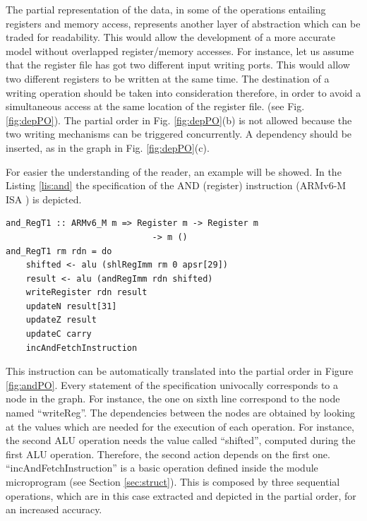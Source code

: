 \documentclass[conference]{IEEEtran}
\begin{document}
The partial representation of the data, in some of the operations entailing registers and
memory access, represents another layer of abstraction which can be traded for readability.
This would allow the development of a more accurate model without overlapped register/memory
accesses. For instance, let us assume that the register file has got two different input
writing ports. This would allow two different registers to be written at the same time.
The destination of a writing operation should be taken into consideration therefore,
in order to avoid a simultaneous access at the same location of the register file.
(see Fig. \ref{fig:depPO}). The partial order in Fig. \ref{fig:depPO}(b) is not allowed
because the two writing mechanisms can be triggered concurrently.
A dependency should be inserted, as in the graph in Fig. \ref{fig:depPO}(c).

For easier the understanding of the reader, an example will be showed. In the Listing
\ref{lis:and} the specification of the AND (register) instruction (ARMv6-M ISA
\cite{armManual}) is depicted.\\

\begin{lstlisting}[caption="AND (register) instruction - Haskell-based specification",
frame=single, label=lis:and]
and_RegT1 :: ARMv6_M m => Register m -> Register m 
			 				 -> m ()
and_RegT1 rm rdn = do
    shifted <- alu (shlRegImm rm 0 apsr[29])
    result <- alu (andRegImm rdn shifted)
    writeRegister rdn result
    updateN result[31]
    updateZ result
    updateC carry
    incAndFetchInstruction
\end{lstlisting}

\noindent
This instruction can be automatically translated into the partial order in Figure
\ref{fig:andPO}. Every statement of the specification univocally corresponds to a node in the
graph. For instance, the one on sixth line correspond to the node named ``writeReg''.
The dependencies between the nodes are obtained by looking at the values which are needed for
the execution of each operation. For instance, the second ALU operation needs the value
called ``shifted'', computed during the first ALU operation. Therefore, the second action
depends on the first one.
``incAndFetchInstruction'' is a basic operation defined inside the module microprogram (see
Section \ref{sec:struct}). This is composed by three sequential operations, which are in this
case extracted and depicted in the partial order, for an increased accuracy.
\end{document}
